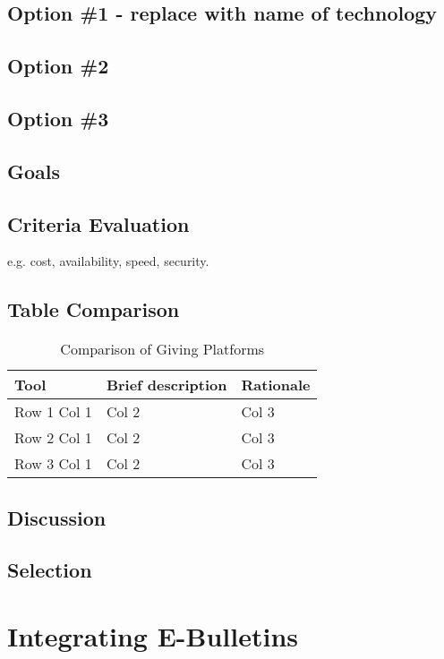 \documentclass[letterpaper,10pt,draftclsnofoot,onecolumn,titlepage]{IEEEtran}
\begin{document}
	\subsection{Option \#1 - replace with name of technology}
	\subsection{Option \#2}
	\subsection{Option \#3}
	\subsection{Goals}
	\subsection{Criteria Evaluation}
	e.g. cost, availability, speed, security.
	\subsection{Table Comparison}
	\begin{table}[ht]
	\caption{Comparison of Giving Platforms}
	\begin{center}
	\begin{tabular} { | m{3cm} | m{5cm} | m{5cm} | }
	\hline\hline
	Tool & Brief description & Rationale \\ [0.5ex]
	\hline
	Row 1 Col 1 & Col 2 & Col 3 \\
	\hline
	Row 2 Col 1 & Col 2 & Col 3 \\
	\hline
	Row 3 Col 1 & Col 2 & Col 3 \\
	\hline
	\end{tabular}
	\end{center}
	\end{table}
	\subsection{Discussion}
	\subsection{Selection}

	\section{Integrating E-Bulletins}
\end{document}
